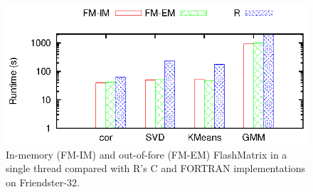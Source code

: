 \begin{figure}[b]
  \vspace{-10pt}
	\begin{center}
		\footnotesize
		\includegraphics{FlashMatrix_figs/FM-vs-R.eps}
		\caption{In-memory (FM-IM) and out-of-fore (FM-EM) FlashMatrix 
        in a single thread compared with R's C and FORTRAN implementations on Friendster-32.}
		\label{fig:fmR}
	\end{center}
  \vspace{-15pt}
\end{figure}

